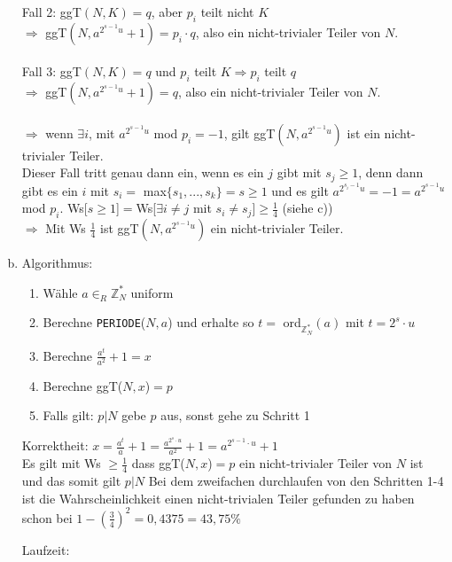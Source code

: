 \documentclass[a4paper]{scrartcl}
\begin{document}
\begin{enumerate}[a)]
Fall 2: ggT$(N, K)=q$, aber $p_i$ teilt nicht $K$\\

$\Rightarrow$ ggT$(N, a^{2^{s-1}u}+1) = p_i \cdot q$, also ein nicht-trivialer Teiler von $N$. \\\\
 
Fall 3:  ggT$(N,K)=q$ und $p_i$ teilt $K \Rightarrow p_i$ teilt $q$ \\
$\Rightarrow$ ggT$(N, a^{2^{s-1}u}+1) = q$, also ein nicht-trivialer Teiler von $N$. \\\\

$\Rightarrow$ wenn $\exists i$, mit $a^{2^{s-1}u}$ mod $p_i=-1$, gilt ggT$(N, a^{2^{s-1}u})$ ist ein nicht-trivialer Teiler.\\
Dieser Fall tritt genau dann ein, wenn es ein $j$ gibt mit $s_j\geq 1$, denn dann gibt es ein $i$ mit $s_i=$ max$\{s_1, ..., s_k\}=s\geq 1$ und es gilt $a^{2^{s_i-1}u} =-1 = a^{2^{s-1}u}$ mod $p_i$.
Ws[$ s\geq 1$]$=$Ws[$\exists i \neq j$ mit $s_i \neq s_j$]$\geq\frac{1}{4}$ (siehe c))\\
$\Rightarrow$ Mit Ws $\frac{1}{4}$ ist ggT$(N, a^{2^{s-1}u})$ ein nicht-trivialer Teiler.



\item
Algorithmus:\\
\begin{enumerate}[1.]
\item Wähle $a\in_R \mathbb{Z}_N^*$ uniform
\item Berechne \texttt{PERIODE}($N,a$) und erhalte so $t =$ ord$_{\mathbb{Z}_N^*}(a)$ mit $t=2^s\cdot u$
\item Berechne $\frac{a^t}{a^2}+1=x$
\item Berechne ggT($N, x$)$=p$
\item Falls gilt: $p | N$ gebe $p$ aus, sonst gehe zu Schritt 1
\end{enumerate}

Korrektheit:
$x=\frac{a^t}{a}+1= \frac{a^{2^s\cdot u}}{a^2}+1= a^{2^{s-1}\cdot u}+1$\\
Es gilt mit Ws $\geq \frac{1}{4}$ dass ggT($N, x$)$=p$ ein nicht-trivialer Teiler von $N$ ist und das somit gilt $p|N$
Bei dem zweifachen durchlaufen von den Schritten 1-4 ist die Wahrscheinlichkeit einen nicht-trivialen Teiler gefunden zu haben schon bei $1-(\frac{3}{4})^2=0,4375=43,75 \%$

Laufzeit:



\end{enumerate}
\end{document}
